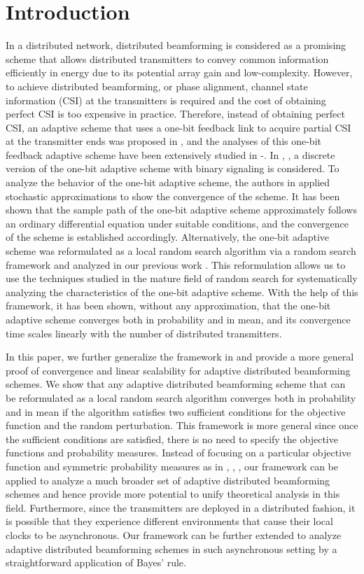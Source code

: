 \documentclass{article}
\newcommand{\ADB}{adaptive distributed beamforming }
\begin{document}
\section{Introduction}\label{sec:intro}
\vspace{-0.20cm}
In a distributed network, distributed beamforming is considered as a promising scheme that allows distributed transmitters to convey common information efficiently in energy due to its potential array gain and low-complexity. However, to achieve distributed beamforming, or phase alignment, channel state information (CSI) at the transmitters is required and the cost of obtaining perfect CSI is too expensive in practice. Therefore, instead of obtaining perfect CSI, an adaptive scheme that uses a one-bit feedback link to acquire partial CSI at the transmitter ends was proposed in \cite{Mudumbai2006}, and the analyses of this one-bit feedback adaptive scheme have been extensively studied in \cite{RM07}\nocite{Johnson08, Thukral07, Bucklew08}-\cite{Lin10}.
In \cite{Johnson08}, \cite{Thukral07}, a discrete version of the one-bit adaptive scheme with binary signaling is considered. 
To analyze the behavior of the one-bit adaptive scheme, the authors in \cite{Bucklew08} applied stochastic approximations to show the convergence of the scheme. It has been shown that the sample path of the one-bit adaptive scheme approximately follows an ordinary differential equation under suitable conditions, and the convergence of the scheme is established accordingly. 
Alternatively, the one-bit adaptive scheme was reformulated as a local random search algorithm via a random search framework and analyzed in our previous work \cite{Lin10}. This reformulation allows us to use the techniques studied in the mature field of random search for systematically analyzing the characteristics of the one-bit adaptive scheme. With the help of this framework, it has been shown, without any approximation, that the one-bit adaptive scheme converges both in probability and in mean, and its convergence time scales linearly with the number of distributed transmitters. 

In this paper, we further generalize the framework in \cite{Lin10} and provide a more general proof of convergence and linear scalability for \ADB schemes. We show that any \ADB scheme that can be reformulated as a local random search algorithm converges both in probability and in mean if the algorithm satisfies two sufficient conditions for the objective function and the random perturbation. 
This framework is more general since once the sufficient conditions are satisfied, there is no need to specify the objective functions and probability measures. 
Instead of focusing on a particular objective function and symmetric probability measures as in \cite{Mudumbai2006}, \cite{Bucklew08}, \cite{Lin10}, our framework can be applied to analyze a much broader set of \ADB schemes and hence provide more potential to unify theoretical analysis in this field.
Furthermore, since the transmitters are deployed in a distributed fashion, it is possible that they experience different environments that cause their local clocks to be asynchronous. Our framework can be further extended to analyze \ADB schemes in such asynchronous setting by a straightforward application of Bayes' rule.
\end{document}
